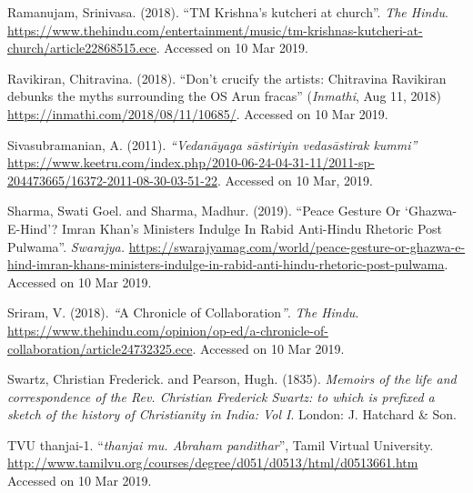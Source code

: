 \begin{thebibliography}{99}
  Ramanujam, Srinivasa. (2018). “TM Krishna’s kutcheri at church”. \textit{The Hindu}. \url{https://www.thehindu.com/entertainment/music/tm-krishnas-kutcheri-at-church/article22868515.ece}. Accessed on 10 Mar 2019.

  Ravikiran, Chitravina. (2018). “Don’t crucify the artists: Chitravina Ravikiran debunks the myths surrounding the OS Arun fracas” (\textit{Inmathi}, Aug 11, 2018) \url{https://inmathi.com/2018/08/11/10685/}. Accessed on 10 Mar 2019.

  Sivasubramanian, A. (2011). \textit{“Vedanāyaga sāstiriyin vedasāstirak kummi”} \url{https://www.keetru.com/index.php/2010-06-24-04-31-11/2011-sp-204473665/16372-2011-08-30-03-51-22}. Accessed on 10 Mar, 2019.

  Sharma, Swati Goel. and Sharma, Madhur. (2019). “Peace Gesture Or ‘Ghazwa-E-Hind’? Imran Khan’s Ministers Indulge In Rabid Anti-Hindu Rhetoric Post Pulwama”. \textit{Swarajya.} \url{https://swarajyamag.com/world/peace-gesture-or-ghazwa-e-hind-imran-khans-ministers-indulge-in-rabid-anti-hindu-rhetoric-post-pulwama}. Accessed on 10 Mar 2019.

  Sriram, V. (2018). \textit{“}A Chronicle of Collaboration\textit{”}. \textit{The Hindu}. \url{https://www.thehindu.com/opinion/op-ed/a-chronicle-of-collaboration/article24732325.ece}. Accessed on 10 Mar 2019.

  Swartz, Christian Frederick. and Pearson, Hugh. (1835). \textit{Memoirs of the life and correspondence of the Rev. Christian Frederick Swartz: to which is prefixed a sketch of the history of Christianity in India: Vol I}. London: J. Hatchard \& Son.

  TVU thanjai-1. “\textit{thanjai mu. Abraham pandithar}”, Tamil Virtual University. \url{http://www.tamilvu.org/courses/degree/d051/d0513/html/d0513661.htm} Accessed on 10 Mar 2019.

 \end{thebibliography}

\theendnotes

